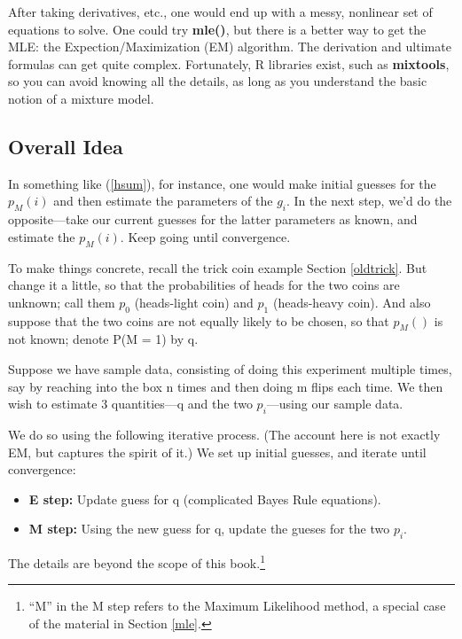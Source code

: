 After taking derivatives, etc., one would end up with a messy, nonlinear
set of equations to solve.  One could try {\bf mle()}, but there is a
better way to get the MLE: the Expection/Maximization (EM) algorithm.
The derivation and ultimate formulas can get quite complex.
Fortunately, R libraries exist, such as {\bf mixtools}, so you can avoid
knowing all the details, as long as you understand the basic notion of a
mixture model.  

\subsection{Overall Idea}

In something like (\ref{hsum}), for instance, one would make initial
guesses for the $p_M(i)$ and then estimate the parameters of the $g_i$.
In the next step, we'd do the opposite---take our current guesses for
the latter parameters as known, and estimate the $p_M(i)$.  Keep going
until convergence.

To make things concrete, recall the trick coin example Section
\ref{oldtrick}.  But change it a little, so that the probabilities of
heads for the two coins are unknown; call them $p_0$ (heads-light coin)
and $p_1$ (heads-heavy coin).  And also suppose that the two coins are
not equally likely to be chosen, so that $p_M()$ is not known; denote
P(M = 1) by q.

Suppose we have sample data, consisting of doing this experiment
multiple times, say by reaching into the box n times and then doing m
flips each time.  We then wish to estimate 3 quantities---q and the two
$p_i$---using our sample data.  

We do so using the following iterative process.  (The account here is
not exactly EM, but captures the spirit of it.) We set up initial
guesses, and iterate until convergence:

\begin{itemize}

\item {\bf E step:} Update guess for q (complicated Bayes Rule equations).

\item {\bf M step:} Using the new guess for q, update the gueses for the
two $p_i$.

\end{itemize}

The details are beyond the scope of this book.\footnote{``M'' in the M
step refers to the Maximum Likelihood method, a special case of the
material in Section \ref{mle}.}

